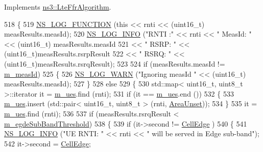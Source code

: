 Implements \hyperlink{classns3_1_1LteFfrAlgorithm_aae66b1b7edbacf07b96e171d89de3f91}{ns3\+::\+Lte\+Ffr\+Algorithm}.


\begin{DoxyCode}
518 \{
519   \hyperlink{log-macros-disabled_8h_a90b90d5bad1f39cb1b64923ea94c0761}{NS\_LOG\_FUNCTION} (\textcolor{keyword}{this} << rnti << (uint16\_t) measResults.measId);
520   \hyperlink{group__logging_gafbd73ee2cf9f26b319f49086d8e860fb}{NS\_LOG\_INFO} (\textcolor{stringliteral}{"RNTI :"} << rnti << \textcolor{stringliteral}{" MeasId: "} << (uint16\_t) measResults.measId
521                         << \textcolor{stringliteral}{" RSRP: "} << (uint16\_t)measResults.rsrpResult
522                         << \textcolor{stringliteral}{" RSRQ: "} << (uint16\_t)measResults.rsrqResult);
523 
524   \textcolor{keywordflow}{if} (measResults.measId != \hyperlink{classns3_1_1LteFrStrictAlgorithm_a9c47b199a62a04ca4d051a28b67ae825}{m\_measId})
525     \{
526       \hyperlink{group__logging_gade7208b4009cdf0e25783cd26766f559}{NS\_LOG\_WARN} (\textcolor{stringliteral}{"Ignoring measId "} << (uint16\_t) measResults.measId);
527     \}
528   \textcolor{keywordflow}{else}
529     \{
530       std::map< uint16\_t, uint8\_t >::iterator it = \hyperlink{classns3_1_1LteFrStrictAlgorithm_a544356f4520ab4afc2af7fb03c02cf17}{m\_ues}.find (rnti);
531       \textcolor{keywordflow}{if} (it == \hyperlink{classns3_1_1LteFrStrictAlgorithm_a544356f4520ab4afc2af7fb03c02cf17}{m\_ues}.end ())
532         \{
533           \hyperlink{classns3_1_1LteFrStrictAlgorithm_a544356f4520ab4afc2af7fb03c02cf17}{m\_ues}.insert (std::pair< uint16\_t, uint8\_t > (rnti, \hyperlink{classns3_1_1LteFrStrictAlgorithm_a70e144d3c83d78ebf979dbad5d191de7ac01973c3dde31fbd14c1b3e922918f18}{AreaUnset}));
534         \}
535       it = \hyperlink{classns3_1_1LteFrStrictAlgorithm_a544356f4520ab4afc2af7fb03c02cf17}{m\_ues}.find (rnti);
536 
537       \textcolor{keywordflow}{if} (measResults.rsrqResult < \hyperlink{classns3_1_1LteFrStrictAlgorithm_a5b90b8eb56e8cbe457a0ea2f21f68dfe}{m\_egdeSubBandThreshold})
538         \{
539           \textcolor{keywordflow}{if} (it->second != \hyperlink{classns3_1_1LteFrStrictAlgorithm_a70e144d3c83d78ebf979dbad5d191de7a263b073dd1aafaf85a35b5cb245b10e6}{CellEdge} )
540             \{
541               \hyperlink{group__logging_gafbd73ee2cf9f26b319f49086d8e860fb}{NS\_LOG\_INFO} (\textcolor{stringliteral}{"UE RNTI: "} << rnti << \textcolor{stringliteral}{" will be served in Edge sub-band"});
542               it->second = \hyperlink{classns3_1_1LteFrStrictAlgorithm_a70e144d3c83d78ebf979dbad5d191de7a263b073dd1aafaf85a35b5cb245b10e6}{CellEdge};

\end{DoxyCode}
